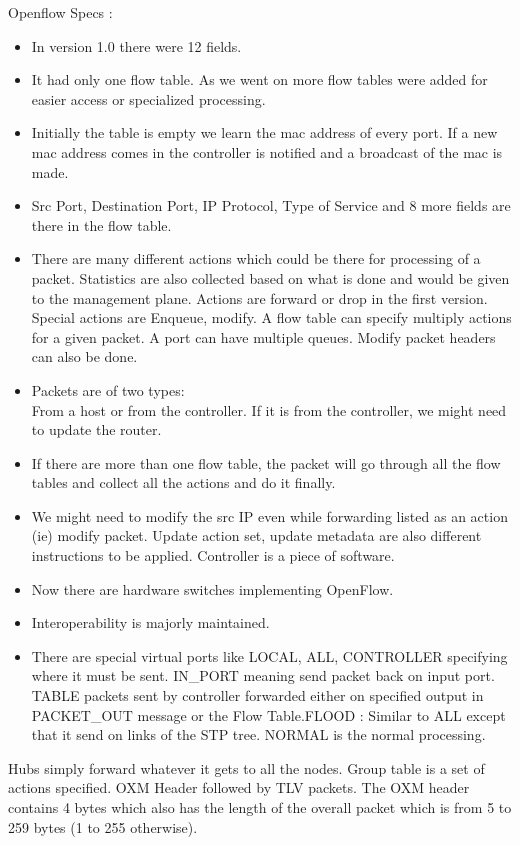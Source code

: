 \documentclass[solution,addpoints,12pt]{exam}
\begin{document}
Openflow Specs :\\
\begin{itemize}
\item In version 1.0 there were 12 fields.
\item It had only one flow table. As we went on more
flow tables were added for easier access or specialized
processing.
\item Initially the table is empty we learn the mac address
of every port. If a new mac address comes in the controller
is notified and a broadcast of the mac is made.
\item Src Port, Destination Port, IP Protocol, Type of Service
and 8 more fields are there in the flow table.
\item There are many different actions which could be there
for processing of a packet. Statistics are also collected based on what
is done and would be given to the management plane.
Actions are forward or drop in the first version.
Special actions are Enqueue, modify. A flow table can
specify multiply actions for a given packet. A port
can have multiple queues. Modify packet headers can also be
done.
\item Packets are of two types:\\
From a host or from the controller. If it is from the controller,
we might need to update the router.
\item If there are more than one flow table, the packet
will go through all the flow tables and collect all the actions
and do it finally.
\item We might need to modify the src IP even while forwarding
listed as an action (ie) modify packet. Update action
set, update metadata are also different instructions to be
applied. Controller is a piece of software.
\item Now there are hardware switches implementing OpenFlow.
\item Interoperability is majorly maintained.
\item There are special virtual ports like LOCAL, ALL, CONTROLLER
specifying where it must be sent. IN_PORT meaning send packet
back on input port. TABLE packets sent by controller
forwarded either on specified output in PACKET_OUT message or the
Flow Table.FLOOD : Similar to ALL except that it send on links of
the STP tree. NORMAL is the normal processing.
\end{itemize}

Hubs simply forward whatever it gets to all the nodes.
Group table is a set of actions specified.
OXM Header followed by TLV packets. The OXM header contains
4 bytes which also has the length of the overall packet which is
from 5 to 259 bytes (1 to 255 otherwise).
\end{document}
